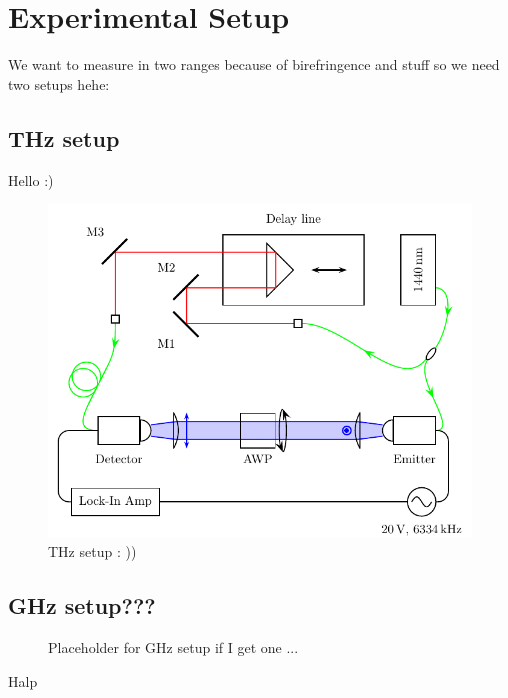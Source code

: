 \section{Experimental Setup}
We want to measure in two ranges because of birefringence and stuff so we need two setups hehe:

\subsection{THz setup}
Hello :)
\begin{figure}[h]
    \centering
    \includegraphics{images/4_chapter04/Setup1_TDS.pdf}
    \caption{THz setup : ))}
    \label{fig:THz_setup}
\end{figure}


\subsection{GHz setup???}
\begin{figure}[h]
    \centering
    \caption{Placeholder for GHz setup if I get one ...}
    \label{fig:GHz_setup}
\end{figure}
Halp

